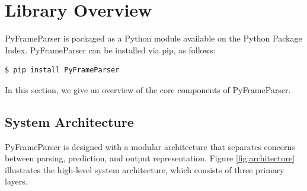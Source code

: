 \section{Library Overview}
\label{sec:overview}

PyFrameParser is packaged as a Python module available on the Python Package Index. PyFrameParser can be installed via pip, as follows:
\begin{verbatim}
$ pip install PyFrameParser
\end{verbatim}

In this section, we give an overview of the core components of PyFrameParser.

\subsection{System Architecture}

PyFrameParser is designed with a modular architecture that separates concerns between parsing, prediction, and output representation. Figure \ref{fig:architecture} illustrates the high-level system architecture, which consists of three primary layers.

